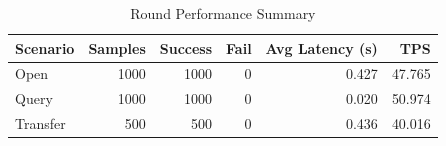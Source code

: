 \begin{table}
\caption{Round Performance Summary}
\label{tab:round_perf}
\begin{tabular}{lrrrrr}
\toprule
Scenario & Samples & Success & Fail & Avg Latency (s) & TPS \\
\midrule
Open & 1000 & 1000 & 0 & 0.427 & 47.765 \\
Query & 1000 & 1000 & 0 & 0.020 & 50.974 \\
Transfer & 500 & 500 & 0 & 0.436 & 40.016 \\
\bottomrule
\end{tabular}
\end{table}
